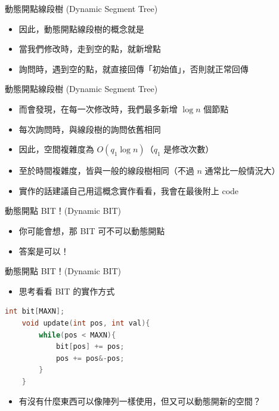 \documentclass[aspectratio=169]{beamer}
\begin{document}
    \begin{frame}{動態開點線段樹 (Dynamic Segment Tree)}
        \begin{itemize}
            \item 因此，動態開點線段樹的概念就是
            \item 當我們修改時，走到空的點，就新增點
            \item 詢問時，遇到空的點，就直接回傳「初始值」，否則就正常回傳
        \end{itemize}
    \end{frame}

    \begin{frame}{動態開點線段樹 (Dynamic Segment Tree)}
        \begin{itemize}
            \item 而會發現，在每一次修改時，我們最多新增 $\log n$ 個節點
            \item 每次詢問時，與線段樹的詢問依舊相同
            \item<2-> 因此，空間複雜度為 $O(q_1 \log n)$（$q_1$ 是修改次數）
            \item<2-> 至於時間複雜度，皆與一般的線段樹相同（不過 $n$ 通常比一般情況大）
            \item<3-> 實作的話建議自己用這概念實作看看，我會在最後附上 code
        \end{itemize}
    \end{frame}

    \begin{frame}{動態開點 BIT！(Dynamic BIT)}
        \begin{itemize}
            \item 你可能會想，那 BIT 可不可以動態開點
            \item<2-> 答案是可以！
        \end{itemize}
    \end{frame}

    \begin{frame}[fragile]{動態開點 BIT！(Dynamic BIT)}
        \begin{itemize}
            \item 思考看看 BIT 的實作方式
        \end{itemize}
        \begin{lstlisting}[language=C++,basicstyle=\ttfamily \small]
    int bit[MAXN];
    void update(int pos, int val){
        while(pos < MAXN){
            bit[pos] += pos;
            pos += pos&-pos;
        }
    }
        \end{lstlisting}
        \begin{itemize}
            \item 有沒有什麼東西可以像陣列一樣使用，但又可以動態開新的空間？
        \end{itemize}
    \end{frame}
\end{document}
